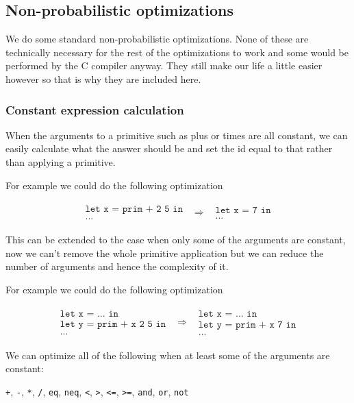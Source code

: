 \documentclass[a4paper]{article}
\newcommand{\optimization}[2]{
	\[
		\begin{array}{rcl}
			#1 & \Rightarrow & #2
		\end{array}
	\]
}
\begin{document}
\subsection{Non-probabilistic optimizations}

We do some standard non-probabilistic optimizations. None of these are technically necessary for the rest of the optimizations to work and some would be performed by the C compiler anyway. They still make our life a little easier however so that is why they are included here.



\subsubsection{Constant expression calculation}

When the arguments to a primitive such as plus or times are all constant, we can easily calculate what the answer should be and set the id equal to that rather than applying a primitive.

For example we could do the following optimization

\optimization{
	\begin{array}{l}
		\texttt{let x = prim + 2 5 in} \\
		\texttt{...}
	\end{array}
}{
	\begin{array}{l}
		\texttt{let x = 7 in} \\
		\texttt{...}
	\end{array}
}

This can be extended to the case when only some of the arguments are constant, now we can't remove the whole primitive application but we can reduce the number of arguments and hence the complexity of it.

For example we could do the following optimization

\optimization{
	\begin{array}{l}
		\texttt{let x = ... in} \\
		\texttt{let y = prim + x 2 5 in} \\
		\texttt{...}
	\end{array}
}{
	\begin{array}{l}
		\texttt{let x = ... in} \\
		\texttt{let y = prim + x 7 in} \\
		\texttt{...}
	\end{array}
}

We can optimize all of the following when at least some of the arguments are constant:
\begin{center}
	\texttt{+}, \texttt{-}, \texttt{*}, \texttt{/}, \texttt{eq}, \texttt{neq}, \texttt{<}, \texttt{>}, \texttt{<=}, \texttt{>=}, \texttt{and}, \texttt{or}, \texttt{not}
\end{center}
\end{document}
